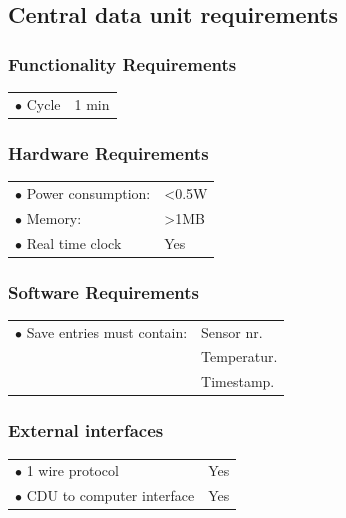 \subsection{Central data unit requirements}

\subsubsection{Functionality Requirements}
\begin{table}[H]
\begin{tabular}{p{10cm} p{2cm}}
$\bullet$ Cycle\footnotemark & 1 min\\
\end{tabular}
\end{table}
\subsubsection{Hardware Requirements}
\begin{table}[H]
\begin{tabular}{p{10cm} p{2cm}}
$\bullet$ Power consumption: & <0.5W \footnotemark \\
$\bullet$ Memory: & >1MB\footnotemark\\
$\bullet$ Real time clock & Yes\\
\end{tabular}
\end{table}

\subsubsection{Software Requirements}
\begin{table}[H]
\begin{tabular}{p{10cm} p{2cm}}
$\bullet$ Save entries must contain: &Sensor nr. \\
~ 									&Temperatur. \\
~									&Timestamp. \\


\end{tabular}
\end{table}


\subsubsection{External interfaces}
\begin{table}[H]
\begin{tabular}{p{10cm} p{2cm}}
$\bullet$ 1 wire protocol & Yes\\
$\bullet$ CDU to computer interface & Yes\\
\end{tabular}
\end{table}


